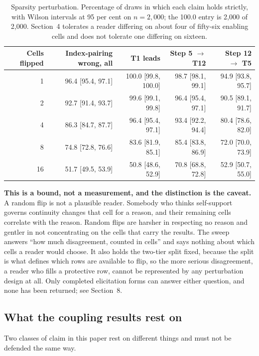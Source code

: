 \documentclass[11pt,a4paper]{article}
\begin{document}
\begin{table}[htbp]\centering\small
\setlength{\tabcolsep}{4pt}
\begin{tabular}{@{}rrrrr@{}}
\toprule
Cells flipped & Index-pairing wrong, all & T1 leads & Step 5 $\to$ T12 & Step 12 $\to$ T5 \\
\midrule
1  & 96.4 [95.4, 97.1] & 100.0 [99.8, 100.0] & 98.7 [98.1, 99.1] & 94.9 [93.8, 95.7] \\
2  & 92.7 [91.4, 93.7] & 99.6 [99.1, 99.8]   & 96.4 [95.4, 97.1] & 90.5 [89.1, 91.7] \\
4  & 86.3 [84.7, 87.7] & 96.4 [95.4, 97.1]   & 93.4 [92.2, 94.4] & 80.4 [78.6, 82.0] \\
8  & 74.8 [72.8, 76.6] & 83.6 [81.9, 85.1]   & 85.4 [83.8, 86.9] & 72.0 [70.0, 73.9] \\
16 & 51.7 [49.5, 53.9] & 50.8 [48.6, 52.9]   & 70.8 [68.8, 72.8] & 52.9 [50.7, 55.0] \\
\bottomrule
\end{tabular}
\caption{Sparsity perturbation. Percentage of draws in which each claim holds
strictly, with Wilson intervals at 95 per cent on $n = 2{,}000$; the 100.0 entry is
2,000 of 2,000. Section~4 tolerates a reader differing on about four of fifty-six
enabling cells and does not tolerate one differing on sixteen.}
\label{tab:sparsity}
\end{table}

\textbf{This is a bound, not a measurement, and the distinction is the caveat.} A
random flip is not a plausible reader. Somebody who thinks self-support governs
continuity changes that cell for a reason, and their remaining cells correlate
with the reason. Random flips are harsher in respecting no reason and gentler in
not concentrating on the cells that carry the results. The sweep answers ``how
much disagreement, counted in cells'' and says nothing about which cells a reader
would choose. It also holds the two-tier split fixed, because the split is what
defines which rows are available to flip, so the more serious disagreement, a
reader who fills a protective row, cannot be represented by any perturbation
design at all. Only completed elicitation forms can answer either question, and
none has been returned; see Section~8.

\subsection{What the coupling results rest on}

Two classes of claim in this paper rest on different things and must not be
defended the same way.
\end{document}
